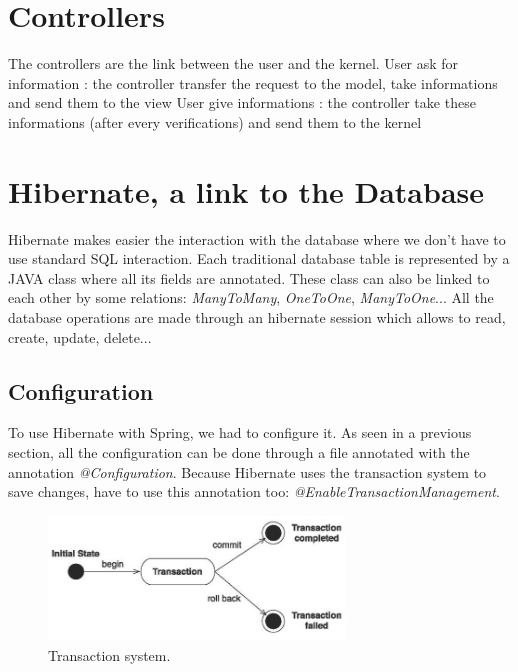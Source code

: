\section{Controllers}

The controllers are the link between the user and the kernel.
User ask for information : the controller transfer the request to the model, take informations and send them to the view
User give informations : the controller take these informations (after every verifications) and send them to the kernel


\section{Hibernate, a link to the Database}

Hibernate makes easier the interaction with the database where we don't have to use standard SQL interaction. 
Each traditional database table is represented by a JAVA class where all its fields are annotated. These class can also be linked to each other by some relations: \textit{ManyToMany}, \textit{OneToOne}, \textit{ManyToOne}...
All the database operations are made through an hibernate session which allows to read, create, update, delete...

\subsection{Configuration}
To use Hibernate with Spring, we had to configure it. As seen in a previous section, all the configuration can be done through a file annotated with the annotation \textit{@Configuration}. 
Because Hibernate uses the transaction system to save changes, have to use this annotation too: \textit{@EnableTransactionManagement}.


\begin{figure}[!ht]
  \caption{Transaction system.}
  \centering
    \includegraphics[width=0.7\textwidth]{img/transaction.jpg}
\end{figure}


